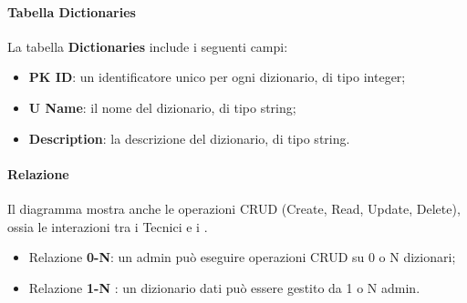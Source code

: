 \paragraph{Tabella Dictionaries}
\par La tabella \textbf{Dictionaries} include i seguenti campi:
\begin{itemize}
    \item \textbf{PK ID}: un identificatore unico per ogni dizionario, di tipo integer;
    \item \textbf{U Name}: il nome del dizionario, di tipo string;
    \item \textbf{Description}: la descrizione del dizionario, di tipo string.
\end{itemize}

\paragraph{Relazione}
Il diagramma mostra anche le operazioni CRUD (Create, Read, Update, Delete), ossia le interazioni tra i Tecnici e i .

\begin{itemize}
      \item Relazione \textbf{0-N}: un admin può eseguire operazioni CRUD su 0 o N dizionari;
    \item Relazione \textbf{1-N} : un dizionario dati può essere gestito da 1 o N admin.
\end{itemize}